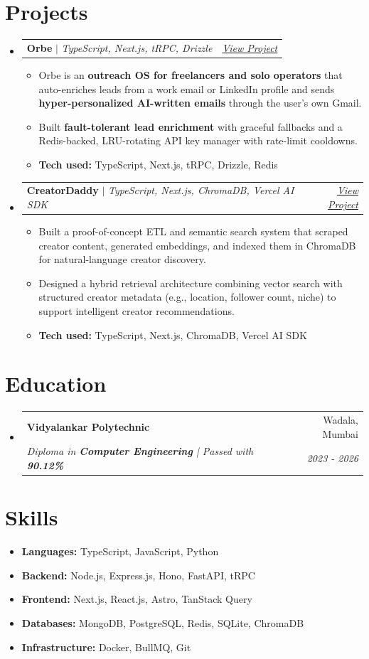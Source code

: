 \documentclass[letterpaper,11pt]{article}
\makeatletter
\newcommand{\resumeItem}[1]{\item\small{#1 \vspace{-2pt}}}
\newcommand{\resumeSubheading}[4]{
  \vspace{-2pt}\item
    \begin{tabular*}{0.97\textwidth}[t]{l@{\extracolsep{\fill}}r}
      \textbf{#1} & #2 \\
      \textit{\small#3} & \textit{\small #4} \\
    \end{tabular*}\vspace{-7pt}
}
\newcommand{\resumeProjectHeading}[2]{
    \item
    \begin{tabular*}{0.97\textwidth}{l@{\extracolsep{\fill}}r}
      \small#1 & #2 \\
    \end{tabular*}\vspace{-7pt}
}
\newcommand{\resumeItemListStart}{\begin{itemize}[leftmargin=0.15in]}
\newcommand{\resumeItemListEnd}{\end{itemize}\vspace{-5pt}}
\makeatother
\begin{document}
\section{Projects}
\resumeItemListStart
  \resumeProjectHeading{\textbf{Orbe} $|$ \emph{TypeScript, Next.js, tRPC, Drizzle}}{\href{https://works.advtszn.xyz/orbe}{\textit{View Project}}}
    \resumeItemListStart
      \resumeItem{Orbe is an \textbf{outreach OS for freelancers and solo operators} that auto-enriches leads from a work email or LinkedIn profile and sends \textbf{hyper-personalized AI-written emails} through the user's own Gmail.}
      \resumeItem{Built \textbf{fault-tolerant lead enrichment} with graceful fallbacks and a Redis-backed, LRU-rotating API key manager with rate-limit cooldowns.}
      \resumeItem{\textbf{Tech used:} TypeScript, Next.js, tRPC, Drizzle, Redis}
    \resumeItemListEnd
  \resumeProjectHeading{\textbf{CreatorDaddy} $|$ \emph{TypeScript, Next.js, ChromaDB, Vercel AI SDK}}{\href{https://works.advtszn.xyz/orbe}{\textit{View Project}}}
    \resumeItemListStart
      \resumeItem{Built a proof-of-concept ETL and semantic search system that scraped creator content, generated embeddings, and indexed them in ChromaDB for natural-language creator discovery.}
      \resumeItem{Designed a hybrid retrieval architecture combining vector search with structured creator metadata (e.g., location, follower count, niche) to support intelligent creator recommendations.}
      \resumeItem{\textbf{Tech used:} TypeScript, Next.js, ChromaDB, Vercel AI SDK}
    \resumeItemListEnd
\resumeItemListEnd

\section{Education}
\resumeItemListStart
  \resumeSubheading
    {Vidyalankar Polytechnic}{Wadala, Mumbai}
    {Diploma in \textbf{Computer Engineering} | Passed with \textbf{90.12\%}}{2023 - 2026}
\resumeItemListEnd

\section{Skills}
\resumeItemListStart
  \resumeItem{\textbf{Languages:} TypeScript, JavaScript, Python}
  \resumeItem{\textbf{Backend:} Node.js, Express.js, Hono, FastAPI, tRPC}
  \resumeItem{\textbf{Frontend:} Next.js, React.js, Astro, TanStack Query}
  \resumeItem{\textbf{Databases:} MongoDB, PostgreSQL, Redis, SQLite, ChromaDB}
  \resumeItem{\textbf{Infrastructure:} Docker, BullMQ, Git}
\resumeItemListEnd
\end{document}
